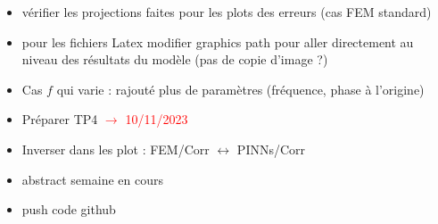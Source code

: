 \begin{itemize}[label=$\square$]
	\item vérifier les projections faites pour les plots des erreurs (cas FEM standard)
	\item pour les fichiers Latex modifier graphics path pour aller directement au niveau des résultats du modèle (pas de copie d'image ?)
	\item Cas $f$ qui varie : rajouté plus de paramètres (fréquence, phase à l'origine) 
	\item Préparer TP4 \textcolor{red}{$\rightarrow$ 10/11/2023}
	\item Inverser dans les plot : FEM/Corr $\leftrightarrow$ PINNs/Corr
	\item abstract semaine en cours
	\item push code github
\end{itemize}